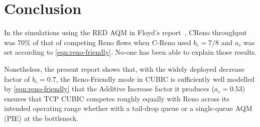 
\section{Conclusion}\label{Conclusion}

In the simulations using the RED AQM in Floyd's report~\cite{Floyd00:Eqn_v_AIMD_cc}, CReno throughput was 70\% of that of competing Reno flows when C-Reno used \(b_c=7/8\) and \(a_c\) was set according to  \autoref{eqn:reno-friendly}. No-one has been able to explain those results. 

Nonetheless, the present report shows that, with the widely deployed decrease factor of \(b_c=0.7\), the Reno-Friendly mode in CUBIC is sufficiently well modelled by \autoref{eqn:reno-friendly} that the Additive Increase factor it produces (\(a_c = 0.53\)) ensures that TCP CUBIC competes roughly equally with Reno across its intended operating range whether with a tail-drop queue or a single-queue AQM (PIE) at the bottleneck.